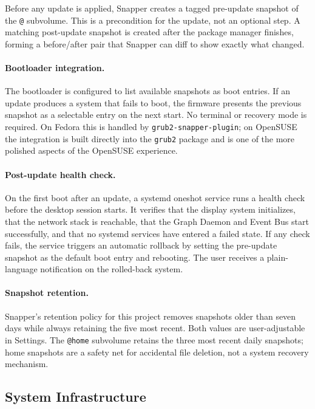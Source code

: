 Before any update is applied, Snapper creates a tagged pre-update snapshot of
the \texttt{@} subvolume. This is a precondition for the update, not an optional
step. A matching post-update snapshot is created after the package manager
finishes, forming a before/after pair that Snapper can diff to show exactly what
changed.

\paragraph{Bootloader integration.}
The bootloader is configured to list available snapshots as boot entries. If an
update produces a system that fails to boot, the firmware presents the previous
snapshot as a selectable entry on the next start. No terminal or recovery mode
is required. On Fedora this is handled by \texttt{grub2-snapper-plugin}; on
OpenSUSE the integration is built directly into the \texttt{grub2} package and
is one of the more polished aspects of the OpenSUSE experience.

\paragraph{Post-update health check.}
On the first boot after an update, a systemd oneshot service runs a health check
before the desktop session starts. It verifies that the display system
initializes, that the network stack is reachable, that the Graph Daemon and
Event Bus start successfully, and that no systemd services have entered a failed
state. If any check fails, the service triggers an automatic rollback by setting
the pre-update snapshot as the default boot entry and rebooting. The user
receives a plain-language notification on the rolled-back system.

\paragraph{Snapshot retention.}
Snapper's retention policy for this project removes snapshots older than seven
days while always retaining the five most recent. Both values are user-adjustable
in Settings. The \texttt{@home} subvolume retains the three most recent daily
snapshots; home snapshots are a safety net for accidental file deletion, not a
system recovery mechanism.

\subsection{System Infrastructure}
\label{sec:infra}

